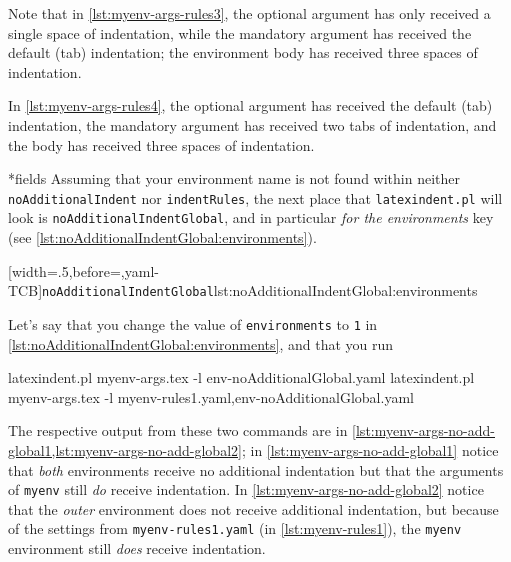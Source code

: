  Note that in \cref{lst:myenv-args-rules3}, the optional argument has only received a
 single space of indentation, while the mandatory argument has received the default (tab)
 indentation; the environment body has received three spaces of indentation.

 In \cref{lst:myenv-args-rules4}, the optional argument has received the default (tab)
 indentation, the mandatory argument has received two tabs of indentation, and the body
 has received three spaces of indentation.

*{fields}
 Assuming that your environment name is not found within neither
 \texttt{noAdditionalIndent} nor \texttt{indentRules}, the next place that
 \texttt{latexindent.pl} will look is \texttt{noAdditionalIndentGlobal}, and in particular
 \emph{for the environments} key (see \cref{lst:noAdditionalIndentGlobal:environments}).

 [width=.5\linewidth,before=\centering,yaml-TCB]{\texttt{noAdditionalIndentGlobal}}{lst:noAdditionalIndentGlobal:environments}

 Let's say that you change the value of \texttt{environments} to \texttt{1} in
 \cref{lst:noAdditionalIndentGlobal:environments}, and that you run 

 \begin{widepage}
  \begin{commandshell}
latexindent.pl myenv-args.tex -l env-noAdditionalGlobal.yaml
latexindent.pl myenv-args.tex -l myenv-rules1.yaml,env-noAdditionalGlobal.yaml
\end{commandshell}
 \end{widepage}

 The respective output from these two commands are in
 \cref{lst:myenv-args-no-add-global1,lst:myenv-args-no-add-global2}; in
 \cref{lst:myenv-args-no-add-global1} notice that \emph{both} environments receive no
 additional indentation but that the arguments of \texttt{myenv} still \emph{do} receive
 indentation. In \cref{lst:myenv-args-no-add-global2} notice that the \emph{outer}
 environment does not receive additional indentation, but because of the settings from
 \texttt{myenv-rules1.yaml} (in \vref{lst:myenv-rules1}), the \texttt{myenv} environment
 still \emph{does} receive indentation.

 \begin{minipage}{.45\textwidth}
 \end{minipage}
 \hfill
 \begin{minipage}{.45\textwidth}
 \end{minipage}

